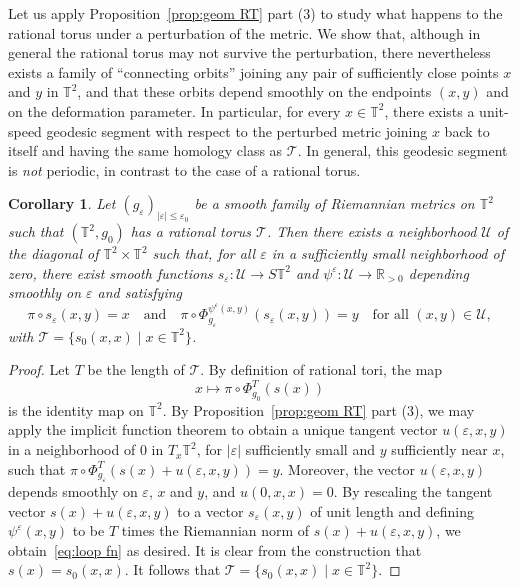 \documentclass[11pt,letterpaper,oneside]{amsart}
\newcommand{\R}{\mathbb{R}}
\newcommand{\T}{\mathbb{T}}
\newtheorem{coro}[theo]{Corollary}
\theoremstyle{definition}
\theoremstyle{remark}
\newcommand{\eps}{\varepsilon}
\theoremstyle{definition}
\theoremstyle{remark}
\newcommand{\CT}{\mathcal{T}}
\newcommand{\CU}{\mathcal{U}}
\newcommand{\et}{\quad \text{and} \quad}
\begin{document}
Let us apply Proposition~\ref{prop:geom RT} part (3) to study what happens to the rational torus under a perturbation of the metric.
We show that, although in general the rational torus may not survive the perturbation, there nevertheless exists a family of ``connecting orbits'' joining any pair of sufficiently close points $x$ and $y$ in $\T^2$, and that these orbits depend smoothly on the endpoints $(x,y)$ and on the deformation parameter.
In particular, for every $x \in \T^2$, there exists a unit-speed geodesic segment with respect to the perturbed metric joining $x$ back to itself and having the same homology class as $\CT$.
In general, this geodesic segment is \emph{not} periodic, in contrast to the case of a rational torus.

\begin{coro}\label{cor:loop fn}
    Let $(g_\eps)_{|\eps| \leq \eps_0}$ be a smooth family of Riemannian metrics on $\T^2$ such that $(\T^2, g_0)$ has a rational torus $\CT$.
    Then there exists a neighborhood $\CU$ of the diagonal of $\T^2 \times \T^2$ such that, for all $\eps$ in a sufficiently small neighborhood of zero, there exist smooth functions $s_\eps: \CU \to S\T^2$ and $\psi^\eps: \CU \to \R_{>0}$ depending smoothly on $\eps$ and satisfying
    \begin{equation}\label{eq:loop fn}
        \pi \circ s_\eps(x,y) = x
        \et
        \pi\circ \Phi^{\psi^\eps(x, y)}_{g_\eps}(s_\eps(x, y)) = y
        \quad \text{for all } (x,y) \in \CU,
    \end{equation}
    with $\CT = \{s_0(x,x) \mid x \in \T^2\}$.
\end{coro}



\begin{proof}
    Let $T$ be the length of $\CT$. By definition of rational tori, the map 
    \begin{equation}
        x \mapsto \pi \circ \Phi^T_{g_0}(s(x))
    \end{equation}
    is the identity map on $\T^2$. 
    By Proposition~\ref{prop:geom RT} part (3), we may apply the implicit function theorem to obtain a unique tangent vector $u(\eps, x, y)$ in a neighborhood of $0$ in $T_x\T^2$, for $|\eps|$ sufficiently small and $y$ sufficiently near $x$, such that $\pi\circ \Phi^T_{g_\eps}(s(x) + u(\eps,x, y)) = y$.
    Moreover, the vector $u(\eps, x,y)$ depends smoothly on $\eps$, $x$ and $y$, and $u(0, x,x) = 0$. By rescaling the tangent vector $s(x) + u(\eps, x,y)$ to a vector $s_\eps(x,y)$ of unit length and defining $\psi^\eps(x,y)$ to be $T$ times the Riemannian norm of $s(x) + u(\eps, x,y)$, we obtain~\eqref{eq:loop fn} as desired.
    It is clear from the construction that $s(x) = s_0(x,x)$. It follows that $\CT = \{s_0(x,x) \mid x \in \T^2\}$.
\end{proof}
\end{document}
